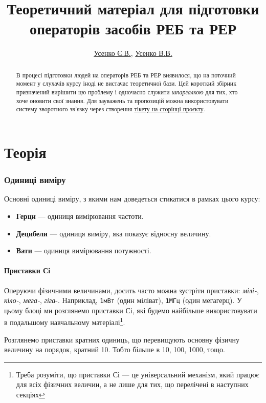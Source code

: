 \documentclass{article}
\title{Теоретичний матеріал для підготовки операторів засобів РЕБ та РЕР }
\author{\href{https://www.linkedin.com/in/eugene-usenko/}{Усенко Є.В.}, \href{https://www.linkedin.com/in/volodymyr-usenko-8409736b/}{Усенко В.В.}}
\begin{document}
\maketitle
\begin{abstract}
В процесі підготовки людей на операторів РЕБ та РЕР виявилося, що на поточний момент у слухачів курсу іноді не вистачає теоретичної бази. Цей короткий збірник призначений вирішити цю проблему і одночасно служити \textit{шпаргалкою} для тих, хто хоче оновити свої знання. Для зауважень та пропозицій можна використовувати систему зворотного зв'язку через створення \href{https://github.com/usnbros/sdr-dsp-book}{тікету на сторінці проєкту}.
\end{abstract}

\newpage
\tableofcontents

\newpage
\part{Теорія}
\section{Одиниці виміру}

Основні одиниці виміру, з якими нам доведеться стикатися в рамках цього курсу:

\begin{itemize}[noitemsep, topsep=8pt]
\item \textbf{Герци} — одиниця вимірювання частоти.
\item \textbf{Децибели} — одиниця виміру, яка показує відносну величину.
\item \textbf{Вати} — одиниця вимірювання потужності.
\end{itemize}

\subsection{Приставки Сі}
Оперуючи фізичними величинами, досить часто можна зустріти приставки: \textit{мілі-}, \textit{кіло-}, \textit{мега-}, \textit{гіга}-. Наприклад, \texttt{1мВт} (один міліват), \texttt{1МГц} (один мегагерц). У цьому блоці ми розглянемо приставки Сі, які будемо найбільше використовувати в подальшому навчальному матеріалі\footnote{Треба розуміти, що приставки Сі — це універсальний механізм, який працює для всіх фізичних величин, а не лише для тих, що перелічені в наступних секціях}.

Розглянемо приставки кратних одиниць, що перевищують основну фізичну величину на порядок, кратний 10. Тобто більше в 10, 100, 1000, тощо.
\end{document}
